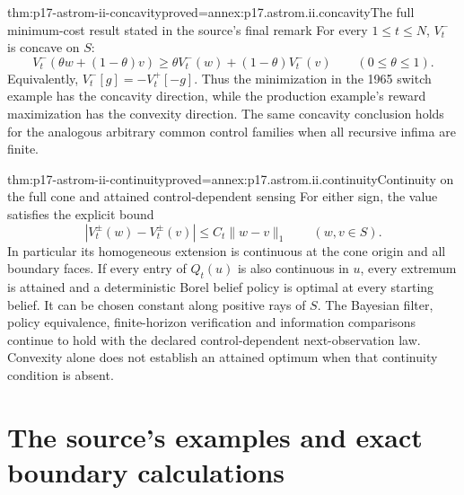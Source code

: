 \begin{hbtheorem}{thm:p17-astrom-ii-concavity}{proved=annex:p17.astrom.ii.concavity}{The full minimum-cost result stated in the source's final remark}
For every \(1\leq t\leq N\), \(V_t^-\) is concave on \(S\):
\[
 V_t^-(\theta w+(1-\theta)v)
          \geq\theta V_t^-(w)+(1-\theta)V_t^-(v)
                      \qquad(0\leq\theta\leq1).
\]
Equivalently,
\(V_t^-[g]= -V_t^+[-g]\).
Thus the minimization in the 1965 switch example has the
concavity direction, while the production example's reward
maximization has the convexity direction.
The same concavity conclusion holds for the analogous
arbitrary common control families when all recursive infima
are finite.
\end{hbtheorem}

\begin{hbtheorem}{thm:p17-astrom-ii-continuity}{proved=annex:p17.astrom.ii.continuity}{Continuity on the full cone and attained control-dependent sensing}
For either sign, the value satisfies the explicit bound
\[
            |V_t^\pm(w)-V_t^\pm(v)|
                            \leq C_t\|w-v\|_1\qquad(w,v\in S).
\]
In particular its homogeneous extension is continuous at
the cone origin and all boundary faces.
If every entry of \(Q_t(u)\) is also continuous in \(u\),
every extremum is attained and a deterministic Borel
belief policy is optimal at every starting belief.
It can be chosen constant along positive rays of \(S\).
The Bayesian filter, policy equivalence, finite-horizon
verification and information comparisons continue to hold
with the declared control-dependent next-observation law.
Convexity alone does not establish an attained optimum when
that continuity condition is absent.
\end{hbtheorem}

\section{The source's examples and exact boundary calculations}

